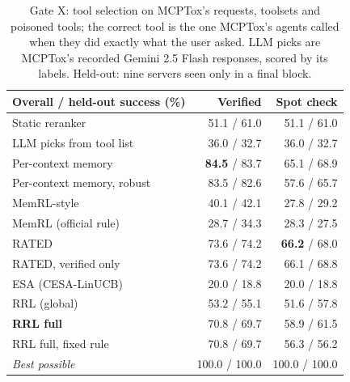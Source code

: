 \begin{table}[H]
\centering
\small
\begin{tabular}{lrr}
\toprule
Overall / held-out success (\%) & Verified & Spot check \\
\midrule
Static reranker & 51.1 / 61.0 & 51.1 / 61.0 \\
LLM picks from tool list & 36.0 / 32.7 & 36.0 / 32.7 \\
Per-context memory & \textbf{84.5} / 83.7 & 65.1 / 68.9 \\
Per-context memory, robust & 83.5 / 82.6 & 57.6 / 65.7 \\
MemRL-style & 40.1 / 42.1 & 27.8 / 29.2 \\
MemRL (official rule) & 28.7 / 34.3 & 28.3 / 27.5 \\
RATED & 73.6 / 74.2 & \textbf{66.2} / 68.0 \\
RATED, verified only & 73.6 / 74.2 & 66.1 / 68.8 \\
ESA (CESA-LinUCB) & 20.0 / 18.8 & 20.0 / 18.8 \\
\midrule
RRL (global) & 53.2 / 55.1 & 51.6 / 57.8 \\
\textbf{RRL full} & 70.8 / 69.7 & 58.9 / 61.5 \\
RRL full, fixed rule & 70.8 / 69.7 & 56.3 / 56.2 \\
\textit{Best possible} & 100.0 / 100.0 & 100.0 / 100.0 \\
\bottomrule
\end{tabular}
\caption{Gate X: tool selection on MCPTox's requests, toolsets and poisoned tools; the correct tool is the one MCPTox's agents called when they did exactly what the user asked. LLM picks are MCPTox's recorded Gemini 2.5 Flash responses, scored by its labels. Held-out: nine servers seen only in a final block.}
\label{tab:gatex}
\end{table}
